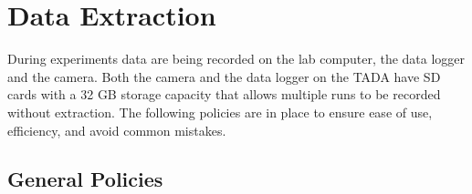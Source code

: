\hypertarget{data-extraction}{%
\section{Data Extraction}\label{data-extraction}}

During experiments data are being recorded on the lab computer, the data
logger and the camera. Both the camera and the data logger on the TADA
have SD cards with a 32 GB storage capacity that allows multiple runs to
be recorded without extraction. The following policies are in place to
ensure ease of use, efficiency, and avoid common mistakes.

\hypertarget{general-policies}{%
\subsection{General Policies}\label{general-policies}}

